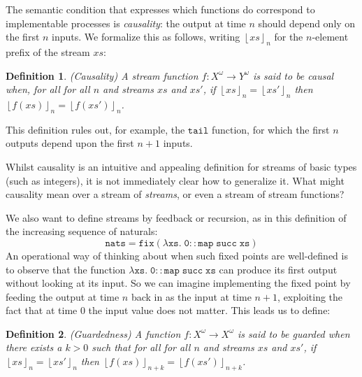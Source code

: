 \documentclass[nocopyrightspace,preprint]{sigplanconf}
\newcommand{\term}[1]{\ensuremath{\mathtt{{#1}}}}
\newcommand{\floor}[1]{\left\lfloor{#1}\right\rfloor}
\newtheorem{definition}{Definition}
\begin{document}
The semantic condition that expresses which functions do correspond to implementable processes is \emph{causality}: 
the output at time $n$ should depend only on the first $n$ inputs. We 
formalize this as follows, writing $\floor{xs}_n$ for the 
$n$-element prefix of the stream $xs$:
\begin{definition}{(Causality)}
A stream function $f : X^\omega \to Y^\omega$ is said to be \emph{causal} when,
for all for all $n$ and streams $xs$ and $xs'$, if $\floor{xs}_n = \floor{xs'}_n$
then $\floor{f(xs)}_n = \floor{f(xs')}_n$.   
\end{definition}
This definition rules out, for example, the \term{tail} function, for which the first
$n$ outputs depend upon the first $n+1$ inputs. 

Whilst causality is an intuitive and appealing definition for
streams of basic types (such as integers), it is not
immediately clear how to generalize it. What
might causality mean over a stream of \emph{streams}, or even a
stream of stream functions? 


We also want to define streams by feedback or recursion, as in this definition of the increasing sequence of naturals:
\begin{displaymath}
\term{nats = fix(\lambda xs.\; 0 :: map\;succ\;xs)}  
\end{displaymath}
An operational way of thinking about when such fixed points are well-defined is to
observe that the function \term{\lambda xs.\; 0 :: map\;succ\;xs} 
can produce its first output without looking at its input. So we can 
imagine implementing the fixed point by feeding the output at time $n$ back in as the input at time $n+1$, exploiting the fact that at 
time 0 the input value does not matter. This leads us to define:

\begin{definition}{(Guardedness)}
A function $f : X^\omega \to X^\omega$ is said to be \emph{guarded}
when there exists a $k > 0$ such that for all for all $n$ and streams
$xs$ and $xs'$, if $\floor{xs}_n = \floor{xs'}_n$ then
$\floor{f(xs)}_{n+k} = \floor{f(xs')}_{n+k}$.
\end{definition}
\end{document}

